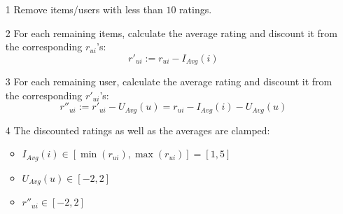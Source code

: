 \documentclass[USenglish,oneside,twocolumn]{article}
\theoremstyle{plain}
\begin{document}
\begin{appendices}
        \begin{itemize}
            \item[1] Remove items/users with less than $10$ ratings.%
            \item[2] For each remaining items, calculate the average rating and discount it from the corresponding $r_{ui}$'s:
            \begin{equation*}
            r'_{ui}:=r_{ui}-I_{Avg}(i)
            \end{equation*}
            \item[3] For each remaining user, calculate the average rating and discount it from the corresponding $r'_{ui}$'s:
            \begin{equation*}
            r''_{ui}:=r'_{ui}-U_{Avg}(u)=r_{ui}-I_{Avg}(i)-U_{Avg}(u)
            \end{equation*}
            \item[4] The discounted ratings as well as the averages are clamped:
            \begin{itemize}
                \item $I_{Avg}(i)\in[\min(r_{ui}), \max(r_{ui})]=[1,5]$
                \item $U_{Avg}(u)\in[-2, 2]$
                \item $r''_{ui}\in[-2, 2]$
            \end{itemize}
        \end{itemize}
        
        
        
        

\end{appendices}
\end{document}
